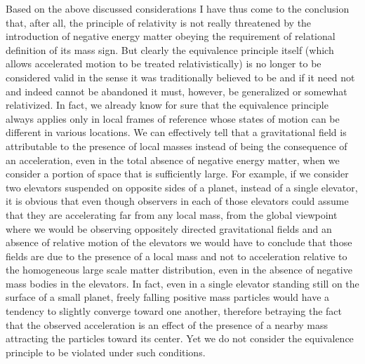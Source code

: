 \documentclass[notitlepage,12pt]{report}
\begin{document}
Based on the above discussed considerations I have thus come to the conclusion that, after all, the principle of relativity is not really threatened by the introduction of negative energy matter obeying the requirement of relational definition of its mass sign. But clearly the equivalence principle itself (which allows accelerated motion to be treated relativistically) is no longer to be considered valid in the sense it was traditionally believed to be and if it need not and indeed cannot be abandoned it must, however, be generalized or somewhat relativized. In fact, we already know for sure that the equivalence principle always applies only in local frames of reference whose states of motion can be different in various locations. We can effectively tell that a gravitational field is attributable to the presence of local masses instead of being the consequence of an acceleration, even in the total absence of negative energy matter, when we consider a portion of space that is sufficiently large. For example, if we consider two elevators suspended on opposite sides of a planet, instead of a single elevator, it is obvious that even though observers in each of those elevators could assume that they are accelerating far from any local mass, from the global viewpoint where we would be observing oppositely directed gravitational fields and an absence of relative motion of the elevators we would have to conclude that those fields are due to the presence of a local mass and not to acceleration relative to the homogeneous large scale matter distribution, even in the absence of negative mass bodies in the elevators. In fact, even in a single elevator standing still on the surface of a small planet, freely falling positive mass particles would have a tendency to slightly converge toward one another, therefore betraying the fact that the observed acceleration is an effect of the presence of a nearby mass attracting the particles toward its center. Yet we do not consider the equivalence principle to be violated under such conditions.
\end{document}
